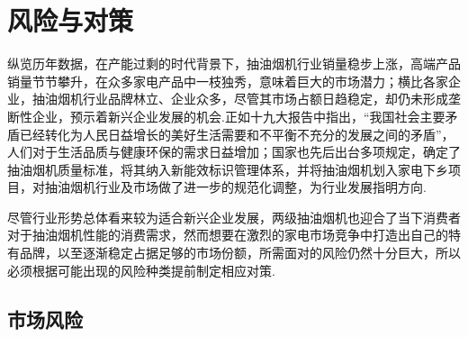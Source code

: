 ﻿\section{风险与对策}
纵览历年数据，在产能过剩的时代背景下，抽油烟机行业销量稳步上涨，高端产品销量节节攀升，在众多家电产品中一枝独秀，意味着巨大的市场潜力；横比各家企业，抽油烟机行业品牌林立、企业众多，尽管其市场占额日趋稳定，却仍未形成垄断性企业，预示着新兴企业发展的机会.正如十九大报告中指出，“我国社会主要矛盾已经转化为人民日益增长的美好生活需要和不平衡不充分的发展之间的矛盾”，人们对于生活品质与健康环保的需求日益增加；国家也先后出台多项规定，确定了抽油烟机质量标准，将其纳入新能效标识管理体系，并将抽油烟机划入家电下乡项目，对抽油烟机行业及市场做了进一步的规范化调整，为行业发展指明方向.

尽管行业形势总体看来较为适合新兴企业发展，两级抽油烟机也迎合了当下消费者对于抽油烟机性能的消费需求，然而想要在激烈的家电市场竞争中打造出自己的特有品牌，以至逐渐稳定占据足够的市场份额，所需面对的风险仍然十分巨大，所以必须根据可能出现的风险种类提前制定相应对策.

\subsection{市场风险}
